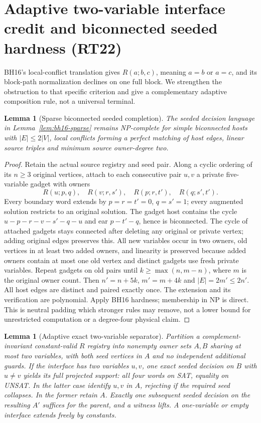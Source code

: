 \documentclass[11pt]{article}
\newtheorem{lemma}[theorem]{Lemma}
\begin{document}
\section{Adaptive two-variable interface credit and biconnected seeded hardness (RT22)}\label{sec:rt22}
BH16's local-conflict translation gives $R(a;b,c)$, meaning $a=b$ or $a=c$, and its block-path normalization declines on one full block. We strengthen the obstruction to that specific criterion and give a complementary adaptive composition rule, not a universal terminal.
\begin{lemma}[Sparse biconnected seeded completion]\label{lem:rt22-completion}
The seeded decision language in Lemma~\ref{lem:bh16-sparse} remains NP-complete for simple biconnected hosts with $|E|\le 2|V|$, local conflicts forming a perfect matching of host edges, linear source triples and minimum source owner-degree two.
\end{lemma}
\begin{proof}
Retain the actual source registry and seed pair. Along a cyclic ordering of its $n\ge3$ original vertices, attach to each consecutive pair $u,v$ a private five-variable gadget with owners
\[
R(u;p,q),\quad R(v;r,s'),\quad R(p;r,t'),\quad R(q;s',t').
\]
Every boundary word extends by $p=r=t'=0$, $q=s'=1$; every augmented solution restricts to an original solution. The gadget host contains the cycle $u-p-r-v-s'-q-u$ and ear $p-t'-q$, hence is biconnected. The cycle of attached gadgets stays connected after deleting any original or private vertex; adding original edges preserves this. All new variables occur in two owners, old vertices in at least two added owners, and linearity is preserved because added owners contain at most one old vertex and distinct gadgets use fresh private variables. Repeat gadgets on old pairs until $k\ge\max(n,m-n)$, where $m$ is the original owner count. Then $n'=n+5k$, $m'=m+4k$ and $|E|=2m'\le2n'$. All host edges are distinct and paired exactly once. The extension and its verification are polynomial. Apply BH16 hardness; membership in NP is direct. This is neutral padding which stronger rules may remove, not a lower bound for unrestricted computation or a degree-four physical claim.
\end{proof}
\begin{lemma}[Adaptive exact two-variable separator]\label{lem:rt22-separator}
Partition a complement-invariant constant-valid $R$ registry into nonempty owner sets $A,B$ sharing at most two variables, with both seed vertices in $A$ and no independent additional guards. If the interface has two variables $u,v$, one exact seeded decision on $B$ with $u\ne v$ yields its full projected support: all four words on SAT, equality on UNSAT. In the latter case identify $u,v$ in $A$, rejecting if the required seed collapses. In the former retain $A$. Exactly one subsequent seeded decision on the resulting $A'$ suffices for the parent, and a witness lifts. A one-variable or empty interface extends freely by constants.
\end{lemma}
\end{document}
